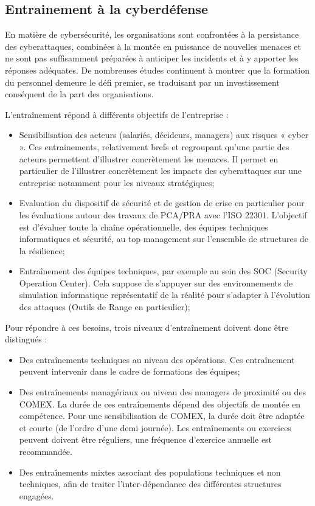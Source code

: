 \subsection{Entrainement à la cyberdéfense}

En matière de cybersécurité, les organisations sont confrontées à la persistance des cyberattaques, combinées à la montée en puissance de nouvelles menaces et ne sont pas suffisamment préparées à anticiper les incidents et à y apporter les réponses adéquates. De nombreuses études continuent à montrer  que la formation du personnel demeure le défi premier, se traduisant par un investissement conséquent de la part des organisations.

L’entraînement répond à différents objectifs de l'entreprise  :
\begin{itemize}
  \item Sensibilisation des acteurs (salariés, décideurs, managers) aux risques « cyber ». Ces entrainements, relativement brefs et regroupant qu'une partie des acteurs  permettent d’illustrer concrètement les menaces. Il permet en particulier de l'illustrer concrètement les impacts des cyberattaques sur une entreprise notamment pour les niveaux stratégiques;
  \item   Evaluation du dispositif de sécurité et de gestion de crise en particulier pour les évaluations autour des travaux de PCA/PRA avec l'ISO 22301. L’objectif est d'évaluer toute la chaîne opérationnelle, des équipes techniques informatiques et sécurité, au top management sur l'ensemble de structures de la résilience;
  \item Entraînement des équipes techniques, par exemple au sein des SOC (Security Operation Center). Cela suppose de s’appuyer sur des environnements de simulation informatique représentatif de la réalité pour s'adapter à l'évolution des attaques (Outils de Range en particulier);
\end{itemize}


Pour répondre à ces besoins, trois niveaux d’entraînement doivent donc être distingués :

\begin{itemize}
  \item Des entraînements techniques au niveau des opérations. Ces entraînement peuvent intervenir dans le cadre de formations des équipes;
  \item Des entraînements managériaux ou niveau des managers de proximité ou des COMEX. La durée de ces entraînements dépend des objectifs de montée en compétence. Pour une  sensibilisation de COMEX,  la durée doit être adaptée et courte (de l'ordre d'une demi journée). Les entraînements  ou exercices peuvent doivent être réguliers, une fréquence d'exercice annuelle est recommandée.
  \item Des entraînements mixtes associant des populations techniques et non techniques, afin de traiter l'inter-dépendance des différentes structures engagées.
\end{itemize}



